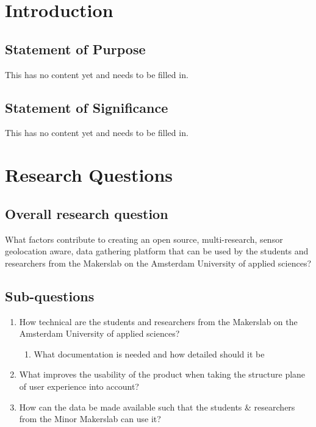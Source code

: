 \documentclass[conference]{IEEEtran}
\begin{document}
\IEEEpeerreviewmaketitle

\section{Introduction}
 

\subsection{Statement of Purpose}
This has no content yet and needs to be filled in. 

\subsection{Statement of Significance}
This has no content yet and needs to be filled in. 

\section{Research Questions}

\subsection{Overall research question}
What factors contribute to creating an open source, multi-research, sensor geolocation aware, data gathering platform that can be used by the students and researchers from the Makerslab on the Amsterdam University of applied sciences?

\subsection{Sub-questions}
\begin{enumerate}
\item How technical are the students and researchers from the Makerslab on the Amsterdam University of applied sciences?
\begin{enumerate}
\item What documentation is needed and how detailed should it be
\end{enumerate}
\item What improves the usability of the product when taking the structure plane of user experience into account?
\item How can the data be made available such that the students \& researchers from the Minor Makerslab can use it?
\end{enumerate}
\end{document}
